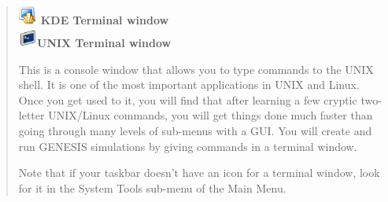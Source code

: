\documentclass[12pt]{article}
\begin{document}
\begin{quote}
	\includegraphics[width=0.05\textwidth]{figures/konsole.eps} {\bf KDE Terminal window} \\
	\includegraphics[width=0.05\textwidth]{figures/gnome-term.eps}{\bf UNIX Terminal window}

This is a console window that allows you to type commands to the UNIX shell. It is one of the most important applications in UNIX and Linux. Once you get used to it, you will find that after learning a few cryptic two-letter UNIX/Linux commands, you will get things done much faster than going through many levels of sub-menus with a GUI. You will create and run GENESIS simulations by giving commands in a terminal window.

Note that if your taskbar doesn't have an icon for a terminal window, look for it in the System Tools sub-menu of the Main Menu.
\end{quote}
\end{document}
